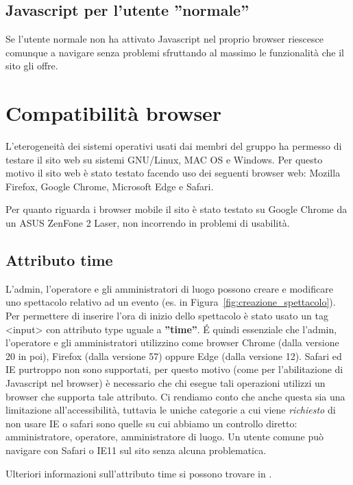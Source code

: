 \documentclass[10pt, a4paper]{article}
\begin{document}
\subsection{Javascript per l'utente ''normale''}
Se l'utente normale non ha attivato Javascript nel proprio browser riescesce comunque a navigare
senza problemi sfruttando al massimo le funzionalità che il sito gli offre.

\section{Compatibilità browser} \label{sec:compatibilita}
L'eterogeneità dei sistemi operativi usati dai membri del gruppo ha permesso di
testare il sito web su sistemi GNU/Linux, MAC OS e Windows.
Per questo motivo il sito web è stato testato facendo uso dei seguenti browser web:
Mozilla Firefox, Google Chrome, Microsoft Edge e Safari.

Per quanto riguarda i browser mobile il sito è stato testato su Google Chrome
da un ASUS ZenFone 2 Laser, non incorrendo in problemi di usabilità.

\subsection{Attributo time} \label{sec:browser}
L'admin, l'operatore e gli amministratori di luogo possono creare e modificare
uno spettacolo relativo ad un evento (es. in Figura~\ref{fig:creazione_spettacolo}).
Per permettere di inserire l'ora di inizio dello spettacolo è stato usato un tag <input> con attributo type uguale a \textbf{''time''}.
É quindi essenziale che l'admin, l'operatore e gli amministratori utilizzino come browser
Chrome (dalla versione 20 in poi), Firefox (dalla versione 57) oppure Edge (dalla versione 12).
Safari ed IE purtroppo non sono supportati, per questo motivo (come per l'abilitazione
di Javascript nel browser) è necessario che chi esegue tali operazioni utilizzi un browser che supporta tale attributo.
Ci rendiamo conto che anche questa sia una limitazione all'accessibilità, tuttavia le uniche categorie a cui viene \emph{richiesto} 
di non usare IE o safari sono quelle su cui abbiamo un controllo diretto: amministratore, operatore, amministratore di luogo.
Un utente comune può navigare con Safari o IE11 sul sito senza alcuna problematica.

Ulteriori informazioni sull'attributo time si possono trovare in \cite{time}.
\end{document}
